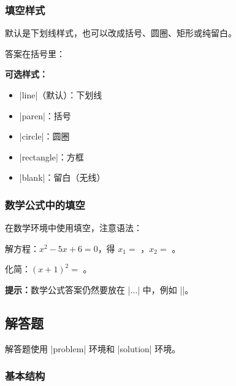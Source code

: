 \subsubsection{填空样式}

默认是下划线样式，也可以改成括号、圆圈、矩形或纯留白。

\begin{latexcode}

  答案在括号里：\fillin[答案]
\end{latexcode}

\textbf{可选样式：}
\begin{itemize}
  \item |line|（默认）：下划线 \fillin[答案]
  \item |paren|：括号 \fillin[type=paren][答案]
  \item |circle|：圆圈 \fillin[type=circle][答案]
  \item |rectangle|：方框 \fillin[type=rectangle][答案]
  \item |blank|：留白（无线）
\end{itemize}

\subsubsection{数学公式中的填空}

在数学环境中使用填空，注意语法：

\begin{latexcode}
  \begin{question}
    解方程：$x^2 - 5x + 6 = 0$，得 $x_1 = $ \fillin[2]，$x_2 = $ \fillin[3]。
  \end{question}

  \begin{question}
    化简：$(x + 1)^2 = $ \fillin[$x^2 + 2x + 1$]。
  \end{question}
\end{latexcode}

\textbf{提示：}数学公式答案仍然要放在 |$...$| 中，例如 |\fillin[$x^2 + 1$]|。


\subsection{解答题}

解答题使用 |problem| 环境和 |solution| 环境。

\subsubsection{基本结构}

